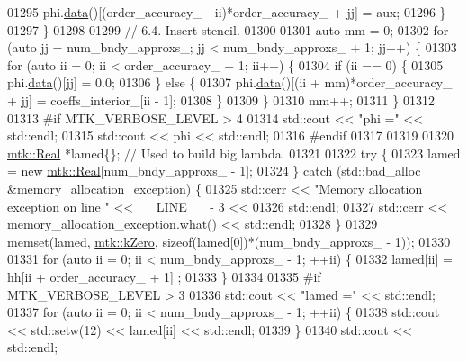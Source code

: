 \begin{DoxyCode}
{{01295         phi.\hyperlink{classmtk_1_1DenseMatrix_a0c33b8a9e01d157c61ddbdf807c25d84}{data}()[(order\_accuracy\_ - ii)*order\_accuracy\_ + jj] = aux;
01296       \}
01297     \}
01298 
01299     \textcolor{comment}{// 6.4. Insert stencil.}
01300 
01301     \textcolor{keyword}{auto} mm = 0;
01302     \textcolor{keywordflow}{for} (\textcolor{keyword}{auto} jj = num\_bndy\_approxs\_; jj < num\_bndy\_approxs\_ +  1; jj++) \{
01303       \textcolor{keywordflow}{for} (\textcolor{keyword}{auto} ii = 0; ii < order\_accuracy\_ + 1; ii++) \{
01304         \textcolor{keywordflow}{if} (ii == 0) \{
01305           phi.\hyperlink{classmtk_1_1DenseMatrix_a0c33b8a9e01d157c61ddbdf807c25d84}{data}()[jj] = 0.0;
01306         \} \textcolor{keywordflow}{else} \{
01307           phi.\hyperlink{classmtk_1_1DenseMatrix_a0c33b8a9e01d157c61ddbdf807c25d84}{data}()[(ii + mm)*order\_accuracy\_ + jj] = coeffs\_interior\_[ii - 1];
01308         \}
01309       \}
01310       mm++;
01311     \}
01312 
01313 \textcolor{preprocessor}{    #if MTK\_VERBOSE\_LEVEL > 4}
01314     std::cout << \textcolor{stringliteral}{"phi ="} << std::endl;
01315     std::cout << phi << std::endl;
01316 \textcolor{preprocessor}{    #endif}
01317 
01319 
01320     \hyperlink{group__c01-roots_gac080bbbf5cbb5502c9f00405f894857d}{mtk::Real} *lamed\{\};  \textcolor{comment}{// Used to build big lambda.}
01321 
01322     \textcolor{keywordflow}{try} \{
01323       lamed = \textcolor{keyword}{new} \hyperlink{group__c01-roots_gac080bbbf5cbb5502c9f00405f894857d}{mtk::Real}[num\_bndy\_approxs\_ - 1];
01324     \} \textcolor{keywordflow}{catch} (std::bad\_alloc &memory\_allocation\_exception) \{
01325       std::cerr << \textcolor{stringliteral}{"Memory allocation exception on line "} << \_\_LINE\_\_ - 3 <<
01326         std::endl;
01327       std::cerr << memory\_allocation\_exception.what() << std::endl;
01328     \}
01329     memset(lamed, \hyperlink{group__c01-roots_ga59a451a5fae30d59649bcda274fea271}{mtk::kZero}, \textcolor{keyword}{sizeof}(lamed[0])*(num\_bndy\_approxs\_ - 1));
01330 
01331     \textcolor{keywordflow}{for} (\textcolor{keyword}{auto} ii = 0; ii < num\_bndy\_approxs\_ - 1; ++ii) \{
01332       lamed[ii] = hh[ii + order\_accuracy\_ + 1] ;
01333     \}
01334 
01335 \textcolor{preprocessor}{    #if MTK\_VERBOSE\_LEVEL > 3}
01336     std::cout << \textcolor{stringliteral}{"lamed ="} << std::endl;
01337     \textcolor{keywordflow}{for} (\textcolor{keyword}{auto} ii = 0; ii < num\_bndy\_approxs\_ - 1; ++ii) \{
01338       std::cout << std::setw(12) << lamed[ii] << std::endl;
01339     \}
01340     std::cout << std::endl;
}}
\end{DoxyCode}
